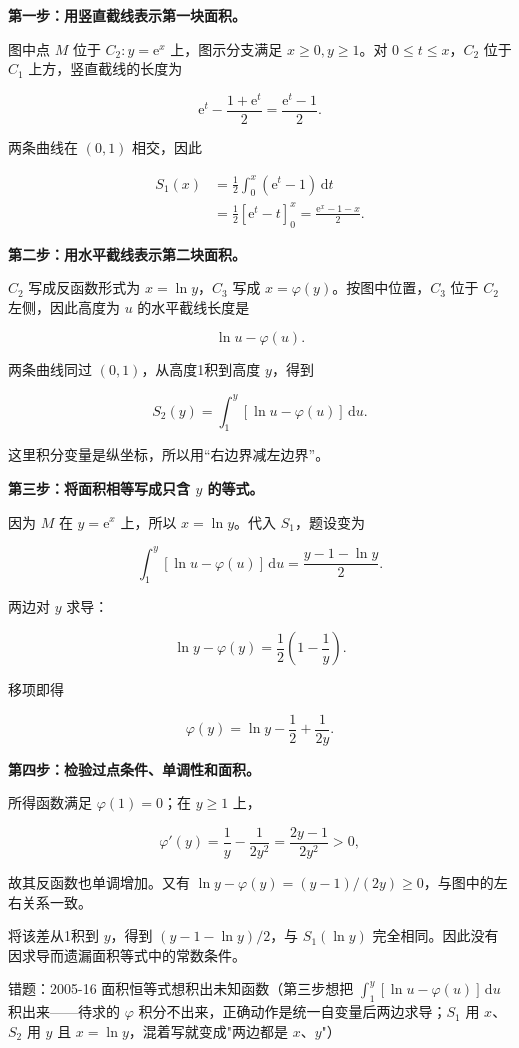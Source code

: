 \documentclass[UTF8,11pt,fontset=windows]{ctexart}
\begin{document}
\textbf{第一步：用竖直截线表示第一块面积。}

图中点 $M$ 位于 $C_2:y=\mathrm e^x$ 上，图示分支满足 $x\ge0,y\ge1$。对 $0\le t\le x$，$C_2$ 位于 $C_1$ 上方，竖直截线的长度为

$$
\mathrm e^t-\frac{1+\mathrm e^t}{2}
=\frac{\mathrm e^t-1}{2}.
$$

两条曲线在 $(0,1)$ 相交，因此

$$
\begin{aligned}
S_1(x)
&=\frac12\int_0^x(\mathrm e^t-1)\,\mathrm dt\\
&=\frac12[\mathrm e^t-t]_0^x
=\frac{\mathrm e^x-1-x}{2}.
\end{aligned}
$$

\textbf{第二步：用水平截线表示第二块面积。}

$C_2$ 写成反函数形式为 $x=\ln y$，$C_3$ 写成 $x=\varphi(y)$。按图中位置，$C_3$ 位于 $C_2$ 左侧，因此高度为 $u$ 的水平截线长度是

$$
\ln u-\varphi(u).
$$

两条曲线同过 $(0,1)$，从高度1积到高度 $y$，得到

$$
S_2(y)=\int_1^y[\ln u-\varphi(u)]\,\mathrm du.
$$

这里积分变量是纵坐标，所以用“右边界减左边界”。

\textbf{第三步：将面积相等写成只含 $y$ 的等式。}

因为 $M$ 在 $y=\mathrm e^x$ 上，所以 $x=\ln y$。代入 $S_1$，题设变为

$$
\int_1^y[\ln u-\varphi(u)]\,\mathrm du
=\frac{y-1-\ln y}{2}.
$$

两边对 $y$ 求导：

$$
\ln y-\varphi(y)=\frac12\left(1-\frac1y\right).
$$

移项即得

$$
\boxed{\varphi(y)=\ln y-\frac12+\frac1{2y}.}
$$

\textbf{第四步：检验过点条件、单调性和面积。}

所得函数满足 $\varphi(1)=0$；在 $y\ge1$ 上，

$$
\varphi'(y)=\frac1y-\frac1{2y^2}
=\frac{2y-1}{2y^2}>0,
$$

故其反函数也单调增加。又有 $\ln y-\varphi(y)=(y-1)/(2y)\ge0$，与图中的左右关系一致。

将该差从1积到 $y$，得到 $(y-1-\ln y)/2$，与 $S_1(\ln y)$ 完全相同。因此没有因求导而遗漏面积等式中的常数条件。

\begingroup\color{gray}错题：2005-16 面积恒等式想积出未知函数（第三步想把 $\int_1^y[\ln u-\varphi(u)]\,\mathrm du$ 积出来——待求的 $\varphi$ 积分不出来，正确动作是统一自变量后两边求导；$S_1$ 用 $x$、$S_2$ 用 $y$ 且 $x=\ln y$，混着写就变成"两边都是 $x$、$y$"）\par\endgroup
\end{document}
